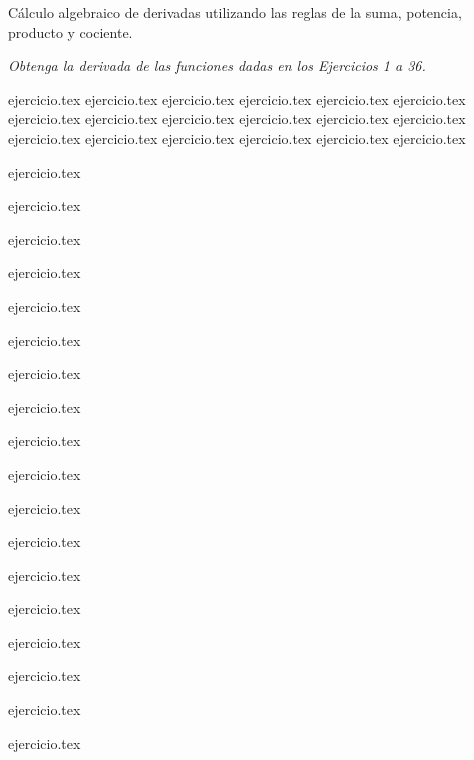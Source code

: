 
Cálculo algebraico de derivadas utilizando las reglas de la suma, potencia, producto y cociente.

\noindent \textit{Obtenga la derivada de las funciones dadas en los Ejercicios 1 a 36.}

\begin{enumerate}
    \begin{minipage}{0.45\textwidth}
    {ejercicio.tex}
    {ejercicio.tex}
    {ejercicio.tex}
    {ejercicio.tex}
    {ejercicio.tex}
    {ejercicio.tex}
    {ejercicio.tex}
    {ejercicio.tex}
    {ejercicio.tex}
    {ejercicio.tex}
    {ejercicio.tex}
    {ejercicio.tex}
    {ejercicio.tex}
    {ejercicio.tex}
    {ejercicio.tex}
    {ejercicio.tex}
    {ejercicio.tex}
    {ejercicio.tex}
    \end{minipage}%
    \begin{minipage}{0.45\textwidth}
    \setcounter{enumi}{1}
    {ejercicio.tex}
    \addtocounter{enumi}{1}
    {ejercicio.tex}
    \addtocounter{enumi}{1}
    {ejercicio.tex}
    \addtocounter{enumi}{1}
    {ejercicio.tex}
    \addtocounter{enumi}{1}
    {ejercicio.tex}
    \addtocounter{enumi}{1}
    {ejercicio.tex}
    \addtocounter{enumi}{1}
    {ejercicio.tex}
    \addtocounter{enumi}{1}
    {ejercicio.tex}
    \addtocounter{enumi}{1}
    {ejercicio.tex}
    \addtocounter{enumi}{1}
    {ejercicio.tex}
    \addtocounter{enumi}{1}
    {ejercicio.tex}
    \addtocounter{enumi}{1}
    {ejercicio.tex}
    \addtocounter{enumi}{1}
    {ejercicio.tex}
    \addtocounter{enumi}{1}
    {ejercicio.tex}
    \addtocounter{enumi}{1}
    {ejercicio.tex}
    \addtocounter{enumi}{1}
    {ejercicio.tex}
    \addtocounter{enumi}{1}
    {ejercicio.tex}
    \addtocounter{enumi}{1}
    {ejercicio.tex}
    \end{minipage}


\end{enumerate}
